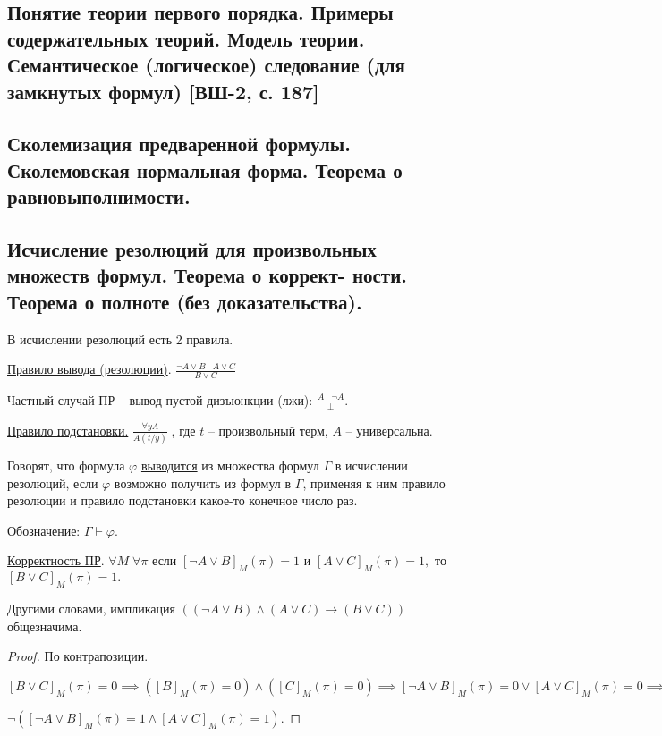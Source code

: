 \documentclass[a4paper, fleqn]{article}
\begin{document}
    \subsection{Понятие теории первого порядка. Примеры содержательных теорий. Модель теории. Семантическое (логическое) следование (для замкнутых формул) [ВШ-2, с. 187]}

    \subsection{Сколемизация предваренной формулы. Сколемовская нормальная форма. Теорема о равновыполнимости.}

    \subsection{Исчисление резолюций для произвольных множеств формул. Теорема о коррект- ности.
        Теорема о полноте (без доказательства).}

    В исчислении резолюций есть 2 правила.


    \underline{Правило вывода (резолюции)}. $\boxed{\frac{\neg A \lor B \; \; \; A \lor C}{B \lor C} } $

    Частный случай ПР -- вывод пустой дизъюнкции (лжи): $\frac{A \; \; \; \neg A}{\perp}.$



    \underline{Правило подстановки.} $\boxed{\frac{\forall y A}{A(t/y)}} \; $, где $t$ -- произвольный терм, $A$ -- универсальна.


    Говорят, что формула $\varphi$ \underline{выводится} из множества  формул $\Gamma$ в исчислении резолюций, если $\varphi$ возможно получить из формул в $\Gamma$, применяя к ним правило резолюции и правило подстановки какое-то конечное число раз.

    Обозначение: $\Gamma \vdash \varphi.$

    \underline{Корректность ПР}. $\forall M \; \forall \pi$ если $[\neg A \lor B]_M (\pi) = 1$  и $[ A \lor C]_M (\pi) = 1,$ то $[B \lor C]_M (\pi) = 1.$

    Другими словами, импликация $( (\neg A \lor B) \land (A \lor C) \to (B \lor C) )$ общезначима.

    \begin{proof} По контрапозиции.

    $[B \lor C]_M (\pi) = 0 \implies \left([B]_M (\pi) = 0\right) \land \left([C]_M (\pi) = 0\right) \implies [\neg A \lor B]_M (\pi) = 0 \lor   [ A \lor C]_M (\pi) = 0 \implies$

    $ \neg([\neg A \lor B]_M (\pi) = 1 \land   [ A \lor C]_M (\pi) = 1).$
    \end{proof}
\end{document}
